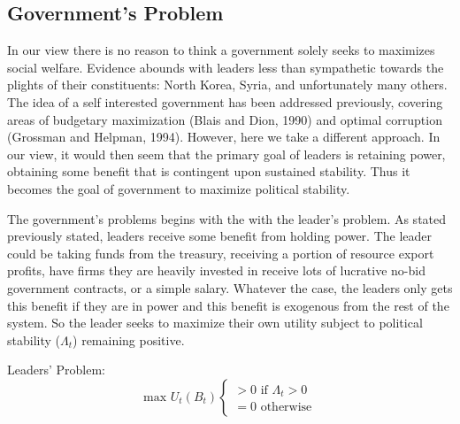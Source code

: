 \documentclass[12pt]{article}
\begin{document}
\begin{spacing}{1.5}


\subsection{Government's Problem} 

In our view there is no reason to think a government solely seeks to maximizes social welfare.  Evidence abounds with leaders less than sympathetic towards the plights of their constituents: North Korea, Syria, and unfortunately many others. The idea of a self interested government has been addressed previously, covering areas of budgetary maximization (Blais and Dion, 1990) and optimal corruption (Grossman and Helpman, 1994). However, here we take a different approach. In our view, it would then seem that the primary goal of leaders is retaining power, obtaining some benefit that is contingent upon sustained stability. Thus it becomes the goal of government to maximize political stability. 


The government's problems begins with the with the leader's problem. As stated previously stated, leaders receive some benefit from holding power. The leader could be taking funds from the treasury, receiving a portion of resource export profits, have firms they are heavily invested in receive lots of lucrative no-bid government contracts, or a simple salary. Whatever the case, the leaders only gets this benefit if they are in power and this benefit is exogenous from the rest of the system. So the leader seeks to maximize their own utility subject to political stability ($\Lambda_t$) remaining positive. 


\vspace{.5 em}
\noindent Leaders' Problem:
\begin{equation}
	 \text{max } U_t(B_t) \begin{cases}
		>0 \text{ if } \Lambda_t > 0 \\
		= 0 \text{ otherwise} 	
	\end{cases}
\end{equation} 


\end{spacing}
\end{document}
